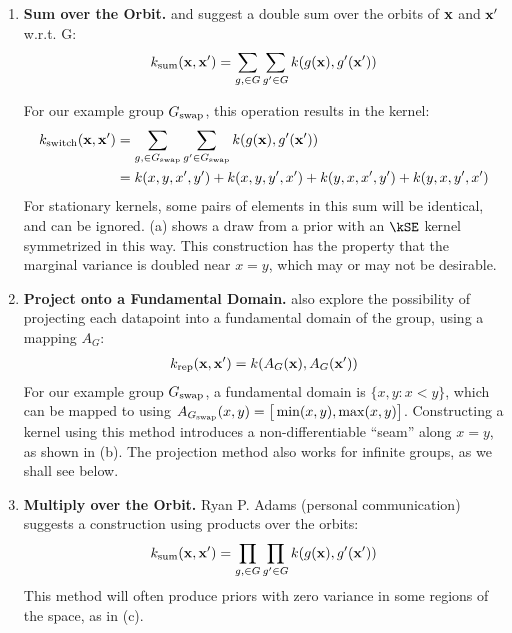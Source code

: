 \begin{enumerate}

\item {\bf Sum over the Orbit.} 
\citet{ginsbourger2012argumentwise} and \citet{kondor2008group} suggest a double sum over the orbits of ${\bf{x}}$ and ${\bf{x}}'$ w.r.t. G:
%
\begin{align}
k_\textnormal{sum}({\bf{x}}, {\bf{x}}') = \sum_{g, \in G} \sum_{g' \in G} k( g( {\bf{x}} ), g'( {\bf{x}}') )
\end{align}

For our example group $G_\textnormal{swap}$, this operation results in the kernel:
%
\begin{align}
k_\textnormal{switch}({\bf{x}}, {\bf{x}}')
& = \sum_{g, \in G_\textnormal{swap}} \sum_{g' \in G_\textnormal{swap}} k( g( {\bf{x}} ), g'( {\bf{x}}') ) \\
& = k(x, y, x', y') + k(x, y, y', x') + k(y, x, x', y') + k(y, x, y', x')
\end{align}
%
For stationary kernels, some pairs of elements in this sum will be identical, and can be ignored.
(a) shows a draw from a \gp{} prior with an $\kSE$ kernel symmetrized in this way.
This construction has the property that the marginal variance is doubled near $x = y$, which may or may not be desirable.



\item {\bf Project onto a Fundamental Domain.}
\citet{Invariances13} also explore the possibility of projecting each datapoint into a fundamental domain of the group, using a mapping $A_G$:
%
\begin{align}
k_\textnormal{rep}({\bf{x}}, {\bf{x}}') = k( A_G({\bf{x}}), A_G( {\bf{x}}') )
\end{align}
%
For our example group $G_\textnormal{swap}$, a fundamental domain is $\{x, y : x < y\}$, which can be mapped to using $A_{G_\textnormal{swap}}( x, y ) = \big[ \min(x,y), \max(x,y) \big]$.
Constructing a kernel using this method introduces a non-differentiable  ``seam'' along $x = y$, as shown in (b).
The projection method also works for infinite groups, as we shall see below.

\item {\bf Multiply over the Orbit.}
Ryan P. Adams (personal communication) suggests a construction using products over the orbits:
%
\begin{align}
k_\textnormal{sum}({\bf{x}}, {\bf{x}}') = \prod_{g, \in G} \prod_{g' \in G} k( g( {\bf{x}} ), g'( {\bf{x}}') )
\end{align}
%
This method will often produce \gp{} priors with zero variance in some regions of the space, as in (c).
\end{enumerate}

